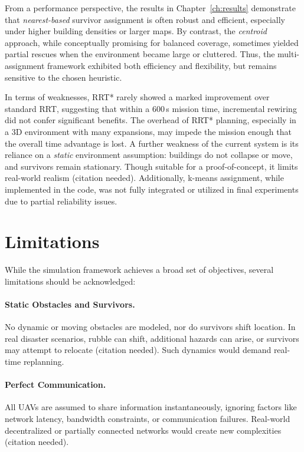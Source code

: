 \documentclass[12pt,a4paper]{report}
\begin{document}
From a performance perspective, the results in Chapter~\ref{ch:results} demonstrate 
that \emph{nearest-based} survivor assignment is often robust and efficient, especially 
under higher building densities or larger maps. By contrast, the \emph{centroid} approach, 
while conceptually promising for balanced coverage, sometimes yielded partial rescues 
when the environment became large or cluttered. Thus, the multi-assignment framework 
exhibited both efficiency and flexibility, but remains sensitive to the chosen heuristic.

In terms of weaknesses, RRT* rarely showed a marked improvement over standard RRT, 
suggesting that within a 600\,s mission time, incremental rewiring did not confer 
significant benefits. The overhead of RRT* planning, especially in a 3D environment 
with many expansions, may impede the mission enough that the overall time advantage 
is lost. A further weakness of the current system is its reliance on a \emph{static} 
environment assumption: buildings do not collapse or move, and survivors remain 
stationary. Though suitable for a proof-of-concept, it limits real-world realism 
(citation needed). Additionally, k-means assignment, while implemented in the code, 
was not fully integrated or utilized in final experiments due to partial reliability 
issues.

\section{Limitations}
\label{sec:limitations}
While the simulation framework achieves a broad set of objectives, several limitations 
should be acknowledged:

\paragraph{Static Obstacles and Survivors.}
No dynamic or moving obstacles are modeled, nor do survivors shift location. In real 
disaster scenarios, rubble can shift, additional hazards can arise, or survivors may 
attempt to relocate (citation needed). Such dynamics would demand real-time replanning.

\paragraph{Perfect Communication.}
All UAVs are assumed to share information instantaneously, ignoring factors like 
network latency, bandwidth constraints, or communication failures. Real-world 
decentralized or partially connected networks would create new complexities (citation needed).
\end{document}

